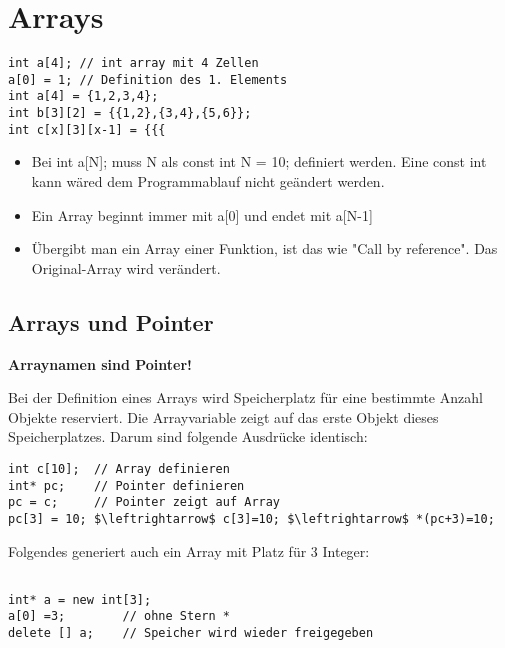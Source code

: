 \section{Arrays}
\begin{lstlisting}
int a[4]; // int array mit 4 Zellen
a[0] = 1; // Definition des 1. Elements
int a[4] = {1,2,3,4}; 
int b[3][2] = {{1,2},{3,4},{5,6}};
int c[x][3][x-1] = {{{ 
\end{lstlisting}

\begin{itemize}
	\item Bei int a[N]; muss N als const int N = 10; definiert werden. Eine const int kann wäred dem Programmablauf nicht geändert werden.  
	\item Ein Array beginnt immer mit a[0] und  endet mit a[N-1]
	\item Übergibt man ein Array einer Funktion, ist das wie "Call by reference". Das Original-Array wird verändert.
	
\end{itemize}

\subsection{Arrays und Pointer}
\textbf{Arraynamen sind Pointer!}

Bei der Definition eines Arrays wird Speicherplatz für eine bestimmte Anzahl Objekte reserviert. Die Arrayvariable zeigt auf das erste Objekt dieses Speicherplatzes. Darum sind folgende Ausdrücke identisch:

\begin{lstlisting}[mathescape]
int c[10]; 	// Array definieren
int* pc; 	// Pointer definieren 
pc = c;		// Pointer zeigt auf Array
pc[3] = 10;	$\leftrightarrow$ c[3]=10; $\leftrightarrow$ *(pc+3)=10;
\end{lstlisting}

Folgendes generiert auch ein Array mit Platz für 3
Integer:

\begin{lstlisting}[mathescape]

int* a = new int[3];
a[0] =3;		// ohne Stern *
delete [] a; 	// Speicher wird wieder freigegeben
\end{lstlisting}
